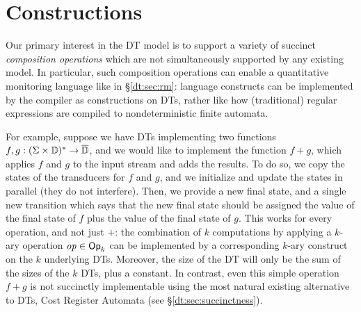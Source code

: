 \section{Constructions}
\label{dt:sec:constructions}

Our primary interest in the DT model is to support a variety of succinct \emph{composition operations} which are not simultaneously supported by any existing model. In particular, such composition operations can enable a quantitative monitoring language like \QREpast{} in \S\ref{dt:sec:rm}: language constructs can be implemented by the compiler as constructions on DTs, rather like how (traditional) regular expressions are compiled to nondeterministic finite automata.

For example, suppose we have DTs implementing two functions $f, g: (\Sigma \times \mathbb{D})^{*} \to \overline{\mathbb{D}{}}$, and we would like to implement the function $f + g$, which applies $f$ and $g$ to the input stream and adds the results.
To do so, we copy the states of the transducers for $f$ and $g$,
and we initialize and update the states in parallel (they do not interfere).
Then, we provide a new final state, and a single new transition which says that the new final state should be assigned the value of the final state of $f$ plus the value of the final state of $g$.
This works for every operation, and not just $+$: the combination of $k$ computations by applying a $k$-ary operation $\mathit{op} \in \textsf{Op}_k$ can be implemented by a corresponding $k$-ary construct on the $k$ underlying DTs. Moreover, the size of the DT will only be the sum of the sizes of the $k$ DTs, plus a constant.
In contrast, even this simple operation $f+g$ is not succinctly implementable using the most natural existing alternative to DTs, Cost Register Automata (see \S\ref{dt:sec:succinctness}).

